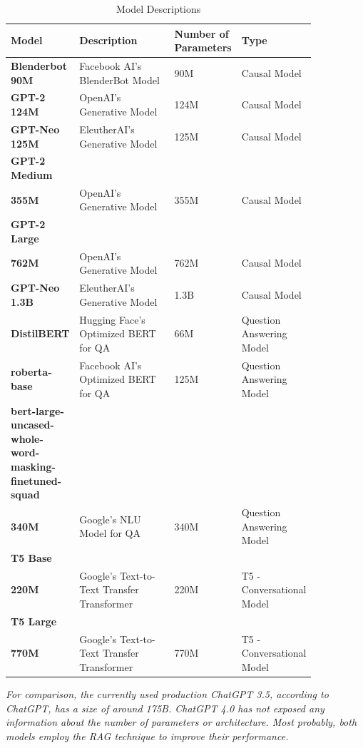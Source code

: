 \documentclass{wseas}
\begin{document}
\begin{table}[htbp]
  \centering
  \caption{Model Descriptions} %
  \label{tab:model_descriptions}  %
  \begin{tabular}{|p{0.2\linewidth}|p{0.35\linewidth}|p{0.15\linewidth}|p{0.15\linewidth}|}
  \hline
  \textbf{Model} & \textbf{Description} & \textbf{Number of Parameters} & \textbf{Type} \\
  \hline
  \textbf{Blenderbot 90M} & Facebook AI's BlenderBot Model & 90M & Causal Model \\
  \hline
  \textbf{GPT-2 124M} & OpenAI's Generative Model & 124M & Causal Model \\
  \hline
  \textbf{GPT-Neo 125M} & EleutherAI's Generative Model & 125M & Causal Model \\
  \hline
  \textbf{GPT-2 Medium} \\ \textbf{355M} & OpenAI's Generative Model & 355M & Causal Model \\
  \hline
  \textbf{GPT-2 Large} \\ \textbf{762M} & OpenAI's Generative Model & 762M & Causal Model \\
  \hline
  \textbf{GPT-Neo 1.3B} & EleutherAI's Generative Model & 1.3B & Causal Model \\
  \hline
  \textbf{DistilBERT} & Hugging Face's Optimized BERT for QA & 66M & Question Answering Model \\
  \hline
  \textbf{roberta-base} & Facebook AI's Optimized BERT for QA & 125M & Question Answering Model \\
  \hline
  \textbf{bert-large-uncased-whole-word-masking-finetuned-squad} \\ \textbf{340M} & Google's NLU Model for QA & 340M & Question Answering Model \\
  \hline
  \textbf{T5 Base} \\ \textbf{220M} & Google's Text-to-Text Transfer Transformer & 220M & T5 - Conversational Model \\
  \hline
  \textbf{T5 Large} \\ \textbf{770M} & Google's Text-to-Text Transfer Transformer & 770M & T5 - Conversational Model \\
  \hline
  \end{tabular}
\end{table}
  
  
  
  

\emph{For comparison, the currently used production ChatGPT 3.5,
according to ChatGPT, has a size of around 175B. ChatGPT 4.0 has not
exposed any information about the number of parameters or architecture.
Most probably, both models employ the RAG technique to improve their
performance.}
\end{document}

